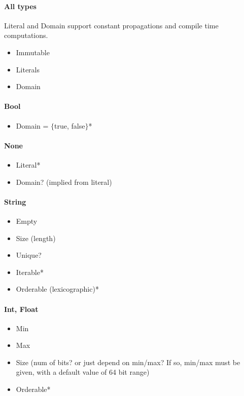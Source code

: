 \documentclass{article}
\begin{document}
\paragraph{All types} Literal and Domain support constant propagations and compile time computations.
\begin{itemize}
  \item Immutable
  \item Literals
  \item Domain
\end{itemize} %

\paragraph{Bool}
\begin{itemize}
  \item Domain = $\{$true, false$\}$*
\end{itemize}

\paragraph{None}
\begin{itemize}
  \item Literal*
  \item Domain? (implied from literal)
\end{itemize}

\paragraph{String}
\begin{itemize}
  \item Empty
  \item Size (length)
  \item Unique?
  \item Iterable*
  \item Orderable (lexicographic)*
\end{itemize}

\paragraph{Int, Float}
\begin{itemize}
  \item Min
  \item Max
  \item Size (num of bits? or just depend on min/max? If so, min/max must be given, with a default value of 64 bit range)
  \item Orderable*
\end{itemize}
\end{document}
